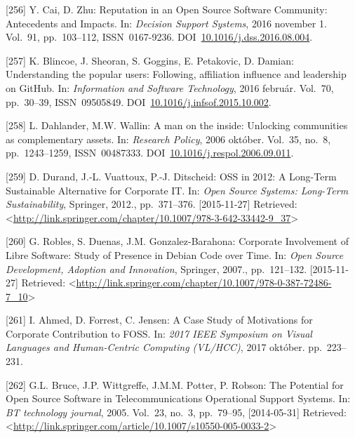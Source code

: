 \documentclass[12pt,magyar,a4paper,oneside]{scrreprt}
\newenvironment{cslreferences}%
  {}%
  {\par}
\begin{document}
\begin{cslreferences}
\leavevmode\hypertarget{ref-cai_reputation_2016}{}%
{[}256{]} Y. Cai, D. Zhu: Reputation in an Open Source Software
Community: Antecedents and Impacts. In: \emph{Decision Support Systems},
2016 november 1. Vol.~91, pp.~103--112, ISSN~0167-9236.
DOI~\href{https://doi.org/10.1016/j.dss.2016.08.004}{10.1016/j.dss.2016.08.004}.

\leavevmode\hypertarget{ref-blincoe_understanding_2016}{}%
{[}257{]} K. Blincoe, J. Sheoran, S. Goggins, E. Petakovic, D. Damian:
Understanding the popular users: Following, affiliation influence and
leadership on GitHub. In: \emph{Information and Software Technology},
2016 február. Vol.~70, pp.~30--39, ISSN~09505849.
DOI~\href{https://doi.org/10.1016/j.infsof.2015.10.002}{10.1016/j.infsof.2015.10.002}.

\leavevmode\hypertarget{ref-dahlander_man_2006}{}%
{[}258{]} L. Dahlander, M.W. Wallin: A man on the inside: Unlocking
communities as complementary assets. In: \emph{Research Policy}, 2006
október. Vol.~35, no.~8, pp.~1243--1259, ISSN~00487333.
DOI~\href{https://doi.org/10.1016/j.respol.2006.09.011}{10.1016/j.respol.2006.09.011}.

\leavevmode\hypertarget{ref-durand_oss_2012}{}%
{[}259{]} D. Durand, J.-L. Vuattoux, P.-J. Ditscheid: OSS in 2012: A
Long-Term Sustainable Alternative for Corporate IT. In: \emph{Open
Source Systems: Long-Term Sustainability}, Springer, 2012.,
pp.~371--376. {[}2015-11-27{]} Retrieved:
\textless{}\url{http://link.springer.com/chapter/10.1007/978-3-642-33442-9_37}\textgreater{}

\leavevmode\hypertarget{ref-robles_corporate_2007}{}%
{[}260{]} G. Robles, S. Duenas, J.M. Gonzalez-Barahona: Corporate
Involvement of Libre Software: Study of Presence in Debian Code over
Time. In: \emph{Open Source Development, Adoption and Innovation},
Springer, 2007., pp.~121--132. {[}2015-11-27{]} Retrieved:
\textless{}\url{http://link.springer.com/chapter/10.1007/978-0-387-72486-7_10}\textgreater{}

\leavevmode\hypertarget{ref-ahmed_case_2017}{}%
{[}261{]} I. Ahmed, D. Forrest, C. Jensen: A Case Study of Motivations
for Corporate Contribution to FOSS. In: \emph{2017 IEEE Symposium on
Visual Languages and Human-Centric Computing (VL/HCC)}, 2017 október.
pp.~223--231.

\leavevmode\hypertarget{ref-bruce_potential_2005}{}%
{[}262{]} G.L. Bruce, J.P. Wittgreffe, J.M.M. Potter, P. Robson: The
Potential for Open Source Software in Telecommunications Operational
Support Systems. In: \emph{BT technology journal}, 2005. Vol.~23, no.~3,
pp.~79--95, {[}2014-05-31{]} Retrieved:
\textless{}\url{http://link.springer.com/article/10.1007/s10550-005-0033-2}\textgreater{}


\end{cslreferences}
\end{document}
